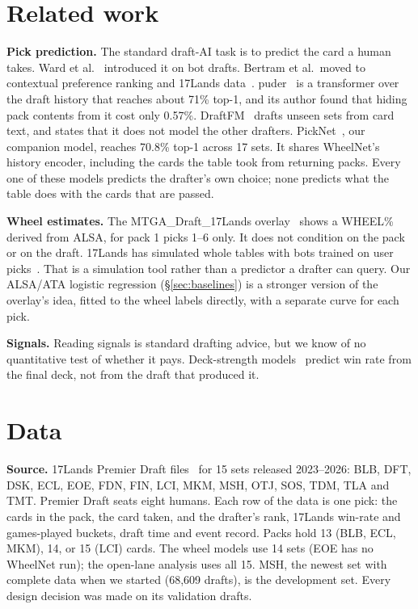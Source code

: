 \documentclass[10pt,letterpaper]{article}
\begin{document}
\section{Related work}

\textbf{Pick prediction.} The standard draft-AI task is to predict the card a human takes. Ward et
al.~\cite{ward2021} introduced it on bot drafts. Bertram et al.\ moved to contextual preference ranking and
17Lands data~\cite{bertram2021,bertram2024infonce}. puder~\cite{puder} is a transformer over the draft history
that reaches about 71\% top-1, and its author found that hiding pack contents from it cost only 0.57\%.
DraftFM~\cite{draftfm} drafts unseen sets from card text, and states that it does not model the other drafters.
PickNet~\cite{picknet}, our companion model, reaches 70.8\% top-1 across 17 sets. It shares WheelNet's history
encoder, including the cards the table took from returning packs. Every one of these models predicts the
drafter's own choice; none predicts what the table does with the cards that are passed.

\textbf{Wheel estimates.} The MTGA\_Draft\_17Lands overlay~\cite{overlay} shows a WHEEL\% derived from
ALSA, for pack 1 picks 1--6 only. It does not condition on the pack or on the draft. 17Lands has simulated
whole tables with bots trained on user picks~\cite{17landssim}. That is a simulation tool rather than a
predictor a drafter can query. Our ALSA/ATA logistic regression (\S\ref{sec:baselines}) is a stronger version of
the overlay's idea, fitted to the wheel labels directly, with a separate curve for each pick.

\textbf{Signals.} Reading signals is standard drafting advice, but we know of no quantitative test of whether
it pays. Deck-strength models~\cite{draftencoder} predict win rate from the final deck, not from the draft
that produced it.

\section{Data}\label{sec:data}

\textbf{Source.} 17Lands Premier Draft files~\cite{17lands} for 15 sets released 2023--2026: BLB, DFT, DSK, ECL,
EOE, FDN, FIN, LCI, MKM, MSH, OTJ, SOS, TDM, TLA and TMT. Premier Draft seats eight humans. Each row of the data
is one pick: the cards in the pack, the card taken, and the drafter's rank, 17Lands win-rate and games-played
buckets, draft time and event record. Packs hold 13 (BLB, ECL, MKM), 14, or 15 (LCI) cards. The wheel models use
14 sets (EOE has no WheelNet run); the open-lane analysis uses all 15. MSH, the newest set with complete
data when we started (68,609 drafts), is the development set. Every design decision was made on its validation
drafts.
\end{document}

